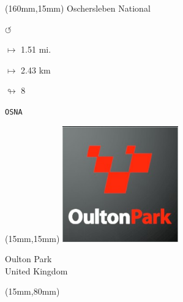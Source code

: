 \begin{textblock*}{40mm}(160mm,15mm)%
Oschersleben National
\par \Huge$\circlearrowleft$
\Large
\par$\mapsto$ 1.51 mi.
\par$\mapsto$ 2.43 km
\par$\looparrowright$ 8
\par\hfill\tiny\tt OSNA\\
\end{textblock*}
\null\newpage

\begin{textblock*}{50mm}(15mm,15mm)%
\includegraphics[width=50mm]{LG/2015-05-20_00091.png}
\par Oulton Park\\ United Kingdom
\end{textblock*}
\begin{textblock*}{185mm}(15mm,80mm)%
\end{textblock*}
